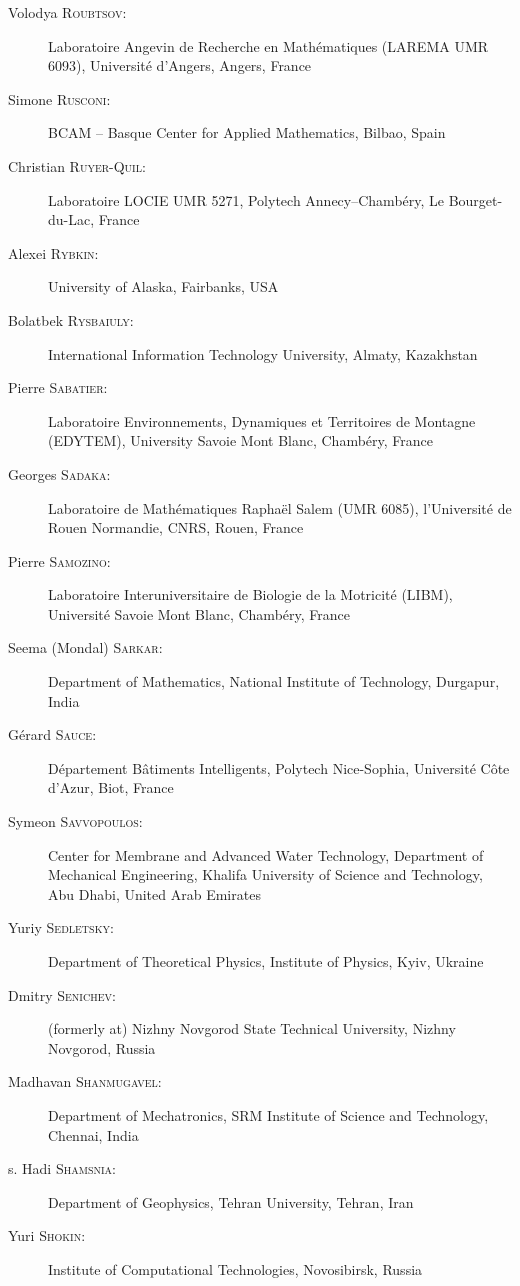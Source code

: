 \begin{description}
  \item[Volodya \textsc{Roubtsov}:] Laboratoire Angevin de Recherche en Math\'ematiques (LAREMA UMR 6093), Universit\'e d'Angers, Angers, France
  \item[Simone \textsc{Rusconi}:] BCAM -- Basque Center for Applied Mathematics, Bilbao, Spain
  \item[Christian \textsc{Ruyer-Quil}:] Laboratoire LOCIE UMR 5271, Polytech Annecy--Chamb\'ery, Le Bourget-du-Lac, France
  \item[Alexei \textsc{Rybkin}:] University of Alaska, Fairbanks, USA
  \item[Bolatbek \textsc{Rysbaiuly}:] International Information Technology University, Almaty, Kazakhstan
  \item[Pierre \textsc{Sabatier}:] Laboratoire Environnements, Dynamiques et Territoires de Montagne (EDYTEM), University Savoie Mont Blanc, Chamb\'ery, France
  \item[Georges \textsc{Sadaka}:] Laboratoire de Math\'ematiques Rapha\"el Salem (UMR 6085), l'Universit\'e de Rouen Normandie, CNRS, Rouen, France
  \item[Pierre \textsc{Samozino}:] Laboratoire Interuniversitaire de Biologie de la Motricit\'e (LIBM), Universit\'e Savoie Mont Blanc, Chamb\'ery, France
  \item[Seema (Mondal) \textsc{Sarkar}:] Department of Mathematics, National Institute of Technology, Durgapur, India
  \item[G\'erard \textsc{Sauce}:] D\'epartement B\^atiments Intelligents, Polytech Nice-Sophia, Universit\'e C\^ote d'Azur, Biot, France
  \item[Symeon \textsc{Savvopoulos}:] Center for Membrane and Advanced Water Technology, Department of Mechanical Engineering, Khalifa University of Science and Technology, Abu Dhabi, United Arab Emirates
  \item[Yuriy \textsc{Sedletsky}:] Department of Theoretical Physics, Institute of Physics, Kyiv, Ukraine
  \item[Dmitry \textsc{Senichev}:] (formerly at) Nizhny Novgorod State Technical University, Nizhny Novgorod, Russia
  \item[Madhavan \textsc{Shanmugavel}:] Department of Mechatronics, SRM Institute of Science and Technology, Chennai, India
  \item[s. Hadi \textsc{Shamsnia}:] Department of Geophysics, Tehran University, Tehran, Iran
  \item[Yuri \textsc{Shokin}:] Institute of Computational Technologies, Novosibirsk, Russia

\end{description}
